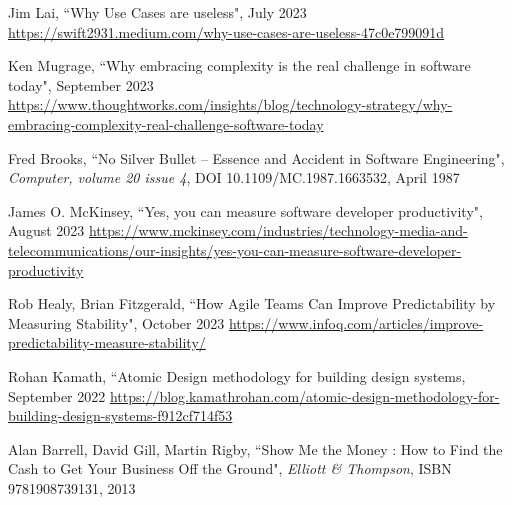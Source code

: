 \begin{thebibliography}{100}
 Jim Lai, ``Why Use Cases are useless", July 2023
\href{https://swift2931.medium.com/why-use-cases-are-useless-47c0e799091d}{https://swift2931.medium.com/why-use-cases-are-useless-47c0e799091d}

 Ken Mugrage, ``Why embracing complexity is the real challenge in software today", September 2023 
\href{https://www.thoughtworks.com/insights/blog/technology-strategy/why-embracing-complexity-real-challenge-software-today}{https://www.thoughtworks.com/insights/blog/technology-strategy/why-embracing-complexity-real-challenge-software-today}

 Fred Brooks, ``No Silver Bullet -- Essence and Accident in Software Engineering", 
\emph{Computer, volume 20 issue 4}, DOI 10.1109/MC.1987.1663532, April 1987

 James O. McKinsey, ``Yes, you can measure software developer productivity", August 2023
\href{https://www.mckinsey.com/industries/technology-media-and-telecommunications/our-insights/yes-you-can-measure-software-developer-productivity}{https://www.mckinsey.com/industries/technology-media-and-telecommunications/our-insights/yes-you-can-measure-software-developer-productivity}

 Rob Healy, Brian Fitzgerald, ``How Agile Teams Can Improve Predictability by Measuring 
Stability", October 2023 
\href{https://www.infoq.com/articles/improve-predictability-measure-stability/}{https://www.infoq.com/articles/improve-predictability-measure-stability/}

 Rohan Kamath, ``Atomic Design methodology for building design systems, September 2022
\href{https://blog.kamathrohan.com/atomic-design-methodology-for-building-design-systems-f912cf714f53}{https://blog.kamathrohan.com/atomic-design-methodology-for-building-design-systems-f912cf714f53}

 Alan Barrell, David Gill, Martin Rigby, ``Show Me the Money : How to Find the Cash to Get Your 
Business Off the Ground", \emph{Elliott \& Thompson}, ISBN 9781908739131, 2013

\end{thebibliography}
